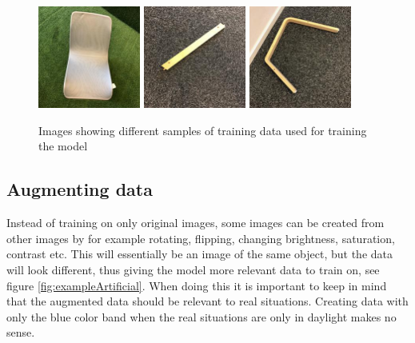 \begin{figure}[hbtp]
\begin{center}
\includegraphics[width = 0.3\textwidth]{./Images/image_31.jpg}
\includegraphics[width = 0.3\textwidth]{./Images/image_133.jpg}
\includegraphics[width = 0.3\textwidth]{./Images/image_136.jpg}

\caption{Images showing different samples of training data used for training the model}
\label{fig:exampleData}
\end{center}
\end{figure}

\subsection{Augmenting data}
Instead of training on only original images, some images can be created from other images by for example rotating, flipping, changing brightness, saturation, contrast etc.  This will essentially be an image of the same object, but the data will look different, thus giving the model more relevant data to train on, see figure \ref{fig:exampleArtificial}.
When doing this it is important to keep in mind that the augmented data should be relevant to real situations.
Creating data with only the blue color band when the real situations are only in daylight makes no sense.

